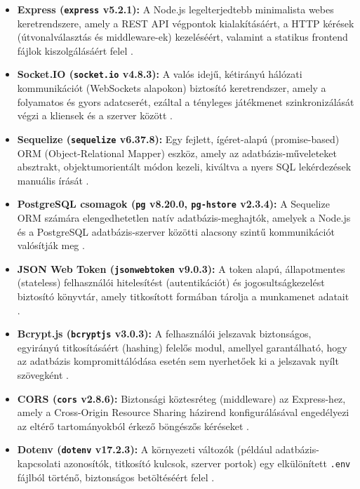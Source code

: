 \begin{itemize}
    \item \textbf{Express (\texttt{express} v5.2.1):} A Node.js legelterjedtebb minimalista webes keretrendszere, amely a REST API végpontok kialakításáért, a HTTP kérések (útvonalválasztás és middleware-ek) kezeléséért, valamint a statikus frontend fájlok kiszolgálásáért felel \cite{expressjs}.
    
    \item \textbf{Socket.IO (\texttt{socket.io} v4.8.3):} A valós idejű, kétirányú hálózati kommunikációt (WebSockets alapokon) biztosító keretrendszer, amely a folyamatos és gyors adatcserét, ezáltal a tényleges játékmenet szinkronizálását végzi a kliensek és a szerver között \cite{socketio}.
    
    \item \textbf{Sequelize (\texttt{sequelize} v6.37.8):} Egy fejlett, ígéret-alapú (promise-based) ORM (Object-Relational Mapper) eszköz, amely az adatbázis-műveleteket absztrakt, objektumorientált módon kezeli, kiváltva a nyers SQL lekérdezések manuális írását \cite{sequelize}.
    
    \item \textbf{PostgreSQL csomagok (\texttt{pg} v8.20.0, \texttt{pg-hstore} v2.3.4):} A Sequelize ORM számára elengedhetetlen natív adatbázis-meghajtók, amelyek a Node.js és a PostgreSQL adatbázis-szerver közötti alacsony szintű kommunikációt valósítják meg \cite{node-postgres}.  
    
    \item \textbf{JSON Web Token (\texttt{jsonwebtoken} v9.0.3):} A token alapú, állapotmentes (stateless) felhasználói hitelesítést (autentikációt) és jogosultságkezelést biztosító könyvtár, amely titkosított formában tárolja a munkamenet adatait \cite{jsonwebtoken}.
    
    \item \textbf{Bcrypt.js (\texttt{bcryptjs} v3.0.3):} A felhasználói jelszavak biztonságos, egyirányú titkosításáért (hashing) felelős modul, amellyel garantálható, hogy az adatbázis kompromittálódása esetén sem nyerhetőek ki a jelszavak nyílt szövegként \cite{bcryptjs}.
    
    \item \textbf{CORS (\texttt{cors} v2.8.6):} Biztonsági köztesréteg (middleware) az Express-hez, amely a Cross-Origin Resource Sharing házirend konfigurálásával engedélyezi az eltérő tartományokból érkező böngészős kéréseket \cite{cors-pkg}.
    
    \item \textbf{Dotenv (\texttt{dotenv} v17.2.3):} A környezeti változók (például adatbázis-kapcsolati azonosítók, titkosító kulcsok, szerver portok) egy elkülönített \texttt{.env} fájlból történő, biztonságos betöltéséért felel \cite{dotenv}.
    

\end{itemize}
